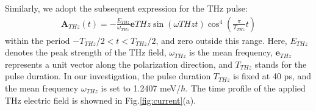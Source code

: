 Similarly, we adopt the subsequent expression for the THz pulse:
\begin{align}
	\mathbf A_{THz}(t) = -\frac{E_{THz}}{\omega_{THz}} \mathbf{e}{THz}
	\sin(\omega{THz} t) \cos^4 \left (\frac{\pi}{T_{THz}} t \right)
	\label{eqn:laser_pulse}
\end{align}
within the period $-T_{THz}/2 < t < T_{THz}/2$, and zero outside this range. Here, $E_{THz}$ denotes the peak strength of the THz field, $\omega_{THz}$ is the mean frequency, $\mathbf e_{THz}$ represents a unit vector along the polarization direction, and $T_{THz}$ stands for the pulse duration. In our investigation, the pulse duration $T_{THz}$ is fixed at 40 ps, and the mean frequency $\omega_{THz}$ is set to 1.2407 meV/$\hbar$. The time profile of the applied THz electric field is showned in Fig.\ref{fig:current}(a).

